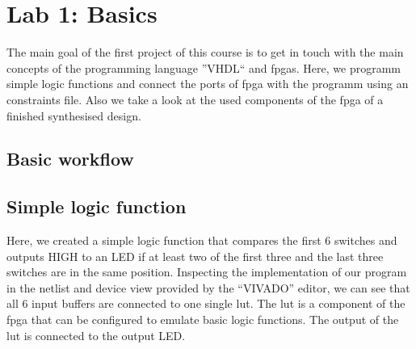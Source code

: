 \chapter{Lab 1: Basics} \label{day1}

The main goal of the first project of this course is to get in touch with the main concepts of the programming language ''VHDL`` and \glspl{fpga}. Here, we programm simple logic functions and connect the ports of \gls{fpga} with the programm using an constraints file. Also we take a look at the used components of the \gls{fpga} of a finished synthesised design.

\section{Basic workflow}



\section{Simple logic function}

Here, we created a simple logic function that compares the first 6 switches and outputs HIGH to an LED if at least two of the first three and the last three switches are in the same position. Inspecting the implementation of our program in the netlist and device view provided by the ``VIVADO'' editor, we can see that all 6 input buffers are connected to one single \gls{lut}. The \gls{lut} is a component of the \gls{fpga} that can be configured to emulate basic logic functions. The output of the \gls{lut} is connected to the output LED.



